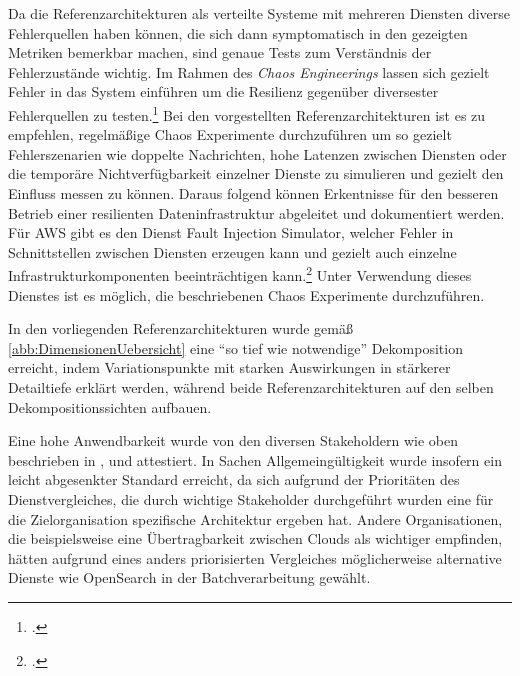 Da die Referenzarchitekturen als verteilte Systeme mit mehreren Diensten diverse Fehlerquellen haben können, die sich dann symptomatisch in den gezeigten Metriken bemerkbar machen, sind genaue Tests zum Verständnis der Fehlerzustände wichtig. Im Rahmen des \textit{Chaos Engineerings} lassen sich gezielt Fehler in das System einführen um die Resilienz gegenüber diversester Fehlerquellen zu testen.\footcite[Vgl.][]{Augsten.2020} Bei den vorgestellten Referenzarchitekturen ist es zu empfehlen, regelmäßige Chaos Experimente durchzuführen um so gezielt Fehlerszenarien wie doppelte Nachrichten, hohe Latenzen zwischen Diensten oder die temporäre Nichtverfügbarkeit einzelner Dienste zu simulieren und gezielt den Einfluss messen zu können. Daraus folgend können Erkentnisse für den besseren Betrieb einer resilienten Dateninfrastruktur abgeleitet und dokumentiert werden. Für \ac{AWS} gibt es den Dienst Fault Injection Simulator, welcher Fehler in Schnittstellen zwischen Diensten erzeugen kann und gezielt auch einzelne Infrastrukturkomponenten beeinträchtigen kann.\footcite[Vgl.][]{Barr.2021b} Unter Verwendung dieses Dienstes ist es möglich, die beschriebenen Chaos Experimente durchzuführen.

In den vorliegenden Referenzarchitekturen wurde gemäß \autoref{abb:DimensionenUebersicht} eine \enquote{so tief wie notwendige} Dekomposition erreicht, indem Variationspunkte mit starken Auswirkungen in stärkerer Detailtiefe erklärt werden, während beide Referenzarchitekturen auf den selben Dekompositionssichten aufbauen.

Eine hohe Anwendbarkeit wurde von den diversen Stakeholdern wie oben beschrieben in ,  und  attestiert.
In Sachen Allgemeingültigkeit wurde insofern ein leicht abgesenkter Standard erreicht, da sich aufgrund der Prioritäten des Dienstvergleiches, die durch wichtige Stakeholder durchgeführt wurden eine für die Zielorganisation spezifische Architektur ergeben hat. Andere Organisationen, die beispielsweise eine Übertragbarkeit zwischen Clouds als wichtiger empfinden, hätten aufgrund eines anders priorisierten Vergleiches möglicherweise alternative Dienste wie OpenSearch in der Batchverarbeitung gewählt.